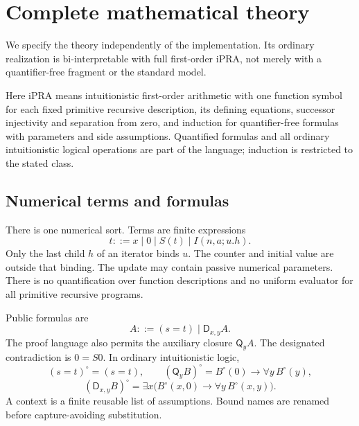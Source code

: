 \documentclass[11pt,a4paper]{article}
\theoremstyle{definition}\newtheorem{definition}[theorem]{Definition}
\theoremstyle{remark}\newtheorem{remark}[theorem]{Remark}
\newcommand{\ipra}{\mathrm{iPRA}}
\newcommand{\D}{\mathsf D}
\newcommand{\Q}{\mathsf Q}
\begin{document}
\section{Complete mathematical theory}
\label{sec:theory}
We specify the theory independently of the implementation. Its ordinary
realization is bi-interpretable with full first-order $\ipra$, not merely
with a quantifier-free fragment or the standard model.

Here $\ipra$ means intuitionistic first-order arithmetic with one function
symbol for each fixed primitive recursive description, its defining
equations, successor injectivity and separation from zero, and induction
for quantifier-free formulas with parameters and side assumptions.
Quantified formulas and all ordinary intuitionistic logical operations are
part of the language; induction is restricted to the stated class.

\subsection{Numerical terms and formulas}
There is one numerical sort. Terms are finite expressions
\[
 t ::= x\mid 0\mid S(t)\mid I(n,a;u.h).
\]
Only the last child $h$ of an iterator binds $u$. The counter and initial
value are outside that binding. The update may contain passive numerical
parameters. There is no quantification over function descriptions and no
uniform evaluator for all primitive recursive programs.

Public formulas are
\[
 A ::= (s=t)\mid\D_{x,y}A.
\]
The proof language also permits the auxiliary closure $\Q_y A$.
The designated contradiction is $0=S0$. In ordinary intuitionistic logic,
\[
 (s=t)^\circ=(s=t),\qquad
 (\Q_yB)^\circ=B^\circ(0)\to\forall y\,B^\circ(y),
\]
\[
 (\D_{x,y}B)^\circ=
 \exists x\bigl(B^\circ(x,0)\to\forall y\,B^\circ(x,y)\bigr).
\]
A context is a finite reusable list of assumptions. Bound names are
renamed before capture-avoiding substitution.
\end{document}
